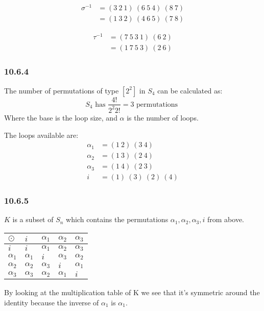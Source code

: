 \documentclass{article}
\begin{document}
	\[
	\begin{split}
	\sigma^{-1} & = (3 \ 2 \ 1) \ (6 \ 5 \ 4) \ (8 \ 7) \\
	& = (1 \ 3 \ 2) \ (4 \ 6 \ 5) \ (7 \ 8)
	\end{split}
	\]
	
	\[
	\begin{split}
	\tau^{-1} & = (7 \ 5 \ 3 \ 1) \ (6 \ 2) \\
	& = (1 \ 7 \ 5 \ 3) \ (2 \ 6)
	\end{split}
	\]
	
	\subsubsection*{10.6.4}
	The number of permutations of type $[2^2]$ in $S_4$ can be calculated as: 
	$$
	S_4 \text{ has }\frac{4!}{2^{2}2!} = 3 \text{ permutations }
	$$
	Where the base is the loop size, and $\alpha$ is the number of loops.
	
	The loops available are:
	\[
	\begin{split}
	\alpha_1 & = (1 \ 2) \ (3 \ 4) \\
	\alpha_2 & = (1 \ 3) \ (2 \ 4) \\
	\alpha_3 & = (1 \ 4) \ (2 \ 3) \\
	i & = (1) \ (3) \ (2) \ (4) 
	\end{split}
	\]
	
	\subsubsection*{10.6.5}
	$K$ is a subset of $S_n$ which contains the permutations $\alpha_1,\alpha_2,\alpha_3, i$ from above. 
	\begin{center}
		\begin{tabular}{ | l | l | l | l | l | }
			\hline
			$\odot$ 	& $i$ 		& $\alpha_1$ 	& $\alpha_2$ & $\alpha_3$ \\ \hline
			$i$ 		& $i$		& $\alpha_1$ 	& $\alpha_2$ & $\alpha_3$ \\ \hline
			$\alpha_1$ 	& $\alpha_1$& $i$ 			& $\alpha_3$ & $\alpha_2$ \\ \hline
			$\alpha_2$ 	& $\alpha_2$& $\alpha_3$	& $i$ 		 & $\alpha_1$ \\ \hline
			$\alpha_3$ 	& $\alpha_3$& $\alpha_2$	& $\alpha_1$ & $i$ \\ 
			\hline
		\end{tabular}
	\end{center}

	By looking at the multiplication table of K we see that it's symmetric around the identity because the inverse of $\alpha_1$ is $\alpha_1$.
	
\end{document}
